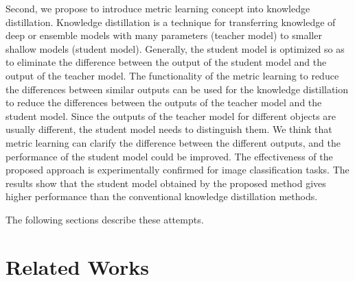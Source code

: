 \documentclass[a4paper,12pt]{article}
\begin{document}
Second, we propose to introduce metric learning concept  into  knowledge  distillation.
Knowledge distillation is a technique for transferring knowledge of deep or ensemble models with many parameters (teacher model) to smaller shallow models (student model).
Generally, the student model is optimized so as to eliminate the difference between the output of the student model and the output of the teacher model.
The  functionality  of  the metric  learning  to  reduce  the  differences  between  similar outputs  can  be  used  for  the  knowledge  distillation  to  reduce the differences between the outputs of the teacher model and the  student  model.  
Since  the  outputs  of  the  teacher  model for  different  objects  are  usually  different,  the  student  model needs  to  distinguish  them.  
We  think  that  metric  learning  can clarify  the  difference  between  the  different  outputs,  and  the performance of the student model could be improved.
The effectiveness of the proposed approach is experimentally confirmed for image classification tasks.
The results show that the student model obtained by the proposed method gives higher performance than the conventional knowledge distillation methods.

The following sections describe these attempts.
\section{Related Works}
\end{document}
